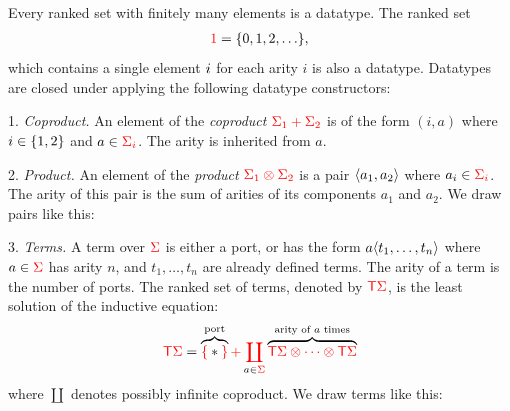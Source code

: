 \begin{definition}[Datatypes] \label{def:types} Every  ranked set with finitely many elements is a datatype. The ranked set
    \begin{align*}
    {\color{red}{1}} = \{0, 1, 2,\ldots\},
    \end{align*}
    which contains a single  element $i$ for each arity $i$ is also a datatype.  Datatypes are closed under applying the following datatype constructors:
    \smallskip 
    
        
    1. \emph{Coproduct.} An element of the \emph{coproduct} ${\color{red}{\Sigma_1 + \Sigma_2}}$ is of the form  $(i,a)$ where $i \in \{1,2\}$ and $a \in {\color{red}{\Sigma_i}}$. The arity is inherited from $a$. 
      

                  \smallskip
            
     2. \emph{Product.} An element of the   \emph{product} %
 ${\color{red}{\Sigma_1 \otimes \Sigma_2}}$  is a  pair $\langle{a_1,a_2}\rangle$ where $a_i \in {\color{red}{\Sigma_i}}$. The arity  of this pair is the sum of arities of its components $a_1$ and $a_2$. We draw pairs like this:
            \smallskip
    
            3. \emph{Terms.}  A term over ${\color{red}{\Sigma}}$ is either a port, or has the form $a \langle{t_1,\ldots,t_n}\rangle$ where $a \in {\color{red}{\Sigma}}$ has arity $n$, and $t_1,\ldots,t_n$ are already defined terms. The arity of a term is the number of ports. The ranked set of terms, denoted by ${\color{red}{\mathsf T}} {\color{red}{\Sigma}}$,  is the least solution of the inductive equation:
            \begin{align*}
            {\color{red}{\mathsf T}} {\color{red}{\Sigma}} = \overbrace{{\color{red}{\{}}* {\color{red}{\}}}}^\text{port}  {\color{red}{+\coprod_{{\color{black}{a \in}} {\color{red}{\Sigma}}}}} \overbrace{{\color{red}{{\color{red}{\mathsf T}}{\color{red}{\Sigma}}\otimes \cdots \otimes {\color{red}{\mathsf T}}{\color{red}{\Sigma}}}}}^{\text{arity of $a$ times}}
            \end{align*}  where $\coprod$ denotes possibly infinite coproduct. We draw terms like this:
            \smallskip
            

\end{definition}
